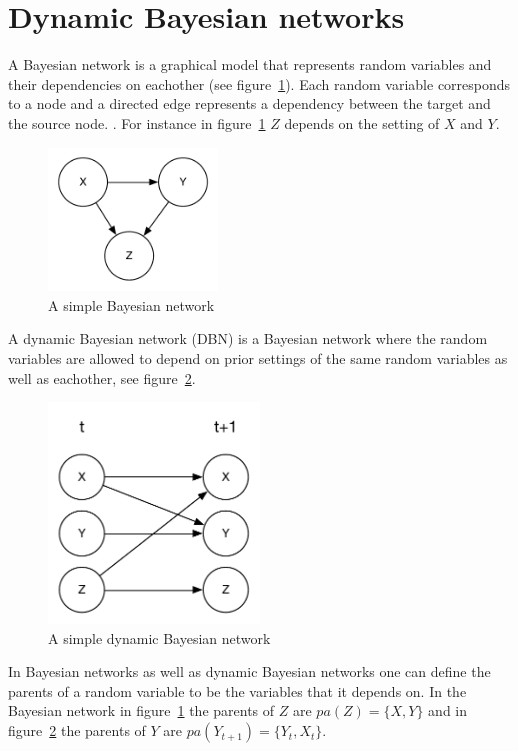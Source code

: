 \section{Dynamic Bayesian networks}

A Bayesian network is a graphical model that represents random variables and
their dependencies on eachother (see figure~\ref{fig:bn}). Each random variable
corresponds to a node and a directed edge represents a dependency between the
target and the source node. \parencite{heckerman1998tutorial}. For instance in
figure~\ref{fig:bn} $Z$ depends on the setting of $X$ and $Y$. 

\begin{figure}[H]
\centering
\includegraphics[width=0.4\textwidth]{images/BN.pdf}
\caption{A simple Bayesian network}
\label{fig:bn}
\end{figure}

A dynamic Bayesian network (DBN) is a Bayesian network where the random
variables are allowed to depend on prior settings of the same random variables
as well as eachother, see figure~\ref{fig:dbn}.

\begin{figure}[H]
    \centering
    \includegraphics[width=0.5\textwidth]{images/DBN.pdf}
    \caption{A simple dynamic Bayesian network}
    \label{fig:dbn}
\end{figure}

In Bayesian networks as well as dynamic Bayesian networks one can define the
parents of a random variable to be the variables that it depends on. In the
Bayesian network in figure~\ref{fig:bn} the parents of $Z$ are $pa(Z) = \{X,
Y\}$ and in figure~\ref{fig:dbn} the parents of $Y$ are $pa(Y_{t+1}) = \{Y_t,
X_t\}$.


